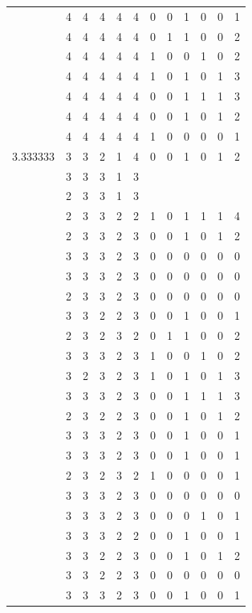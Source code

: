 \documentclass[]{book}
\theoremstyle{definition}
\theoremstyle{definition}
\theoremstyle{definition}
\theoremstyle{remark}
\begin{document}
\begin{table}
{\begin{tabular}[t]{rrrrrrrrrrrr}
 & 4 & 4 & 4 & 4 & 4 & 0 & 0 & 1 & 0 & 0 & 1\\
 & 4 & 4 & 4 & 4 & 4 & 0 & 1 & 1 & 0 & 0 & 2\\
 & 4 & 4 & 4 & 4 & 4 & 1 & 0 & 0 & 1 & 0 & 2\\
 & 4 & 4 & 4 & 4 & 4 & 1 & 0 & 1 & 0 & 1 & 3\\
 & 4 & 4 & 4 & 4 & 4 & 0 & 0 & 1 & 1 & 1 & 3\\
 & 4 & 4 & 4 & 4 & 4 & 0 & 0 & 1 & 0 & 1 & 2\\
 & 4 & 4 & 4 & 4 & 4 & 1 & 0 & 0 & 0 & 0 & 1\\
3.333333 & 3 & 3 & 2 & 1 & 4 & 0 & 0 & 1 & 0 & 1 & 2\\
 & 3 & 3 & 3 & 1 & 3 &  &  &  &  &  & \\
 & 2 & 3 & 3 & 1 & 3 &  &  &  &  &  & \\
 & 2 & 3 & 3 & 2 & 2 & 1 & 0 & 1 & 1 & 1 & 4\\
 & 2 & 3 & 3 & 2 & 3 & 0 & 0 & 1 & 0 & 1 & 2\\
 & 3 & 3 & 3 & 2 & 3 & 0 & 0 & 0 & 0 & 0 & 0\\
 & 3 & 3 & 3 & 2 & 3 & 0 & 0 & 0 & 0 & 0 & 0\\
 & 2 & 3 & 3 & 2 & 3 & 0 & 0 & 0 & 0 & 0 & 0\\
 & 3 & 3 & 2 & 2 & 3 & 0 & 0 & 1 & 0 & 0 & 1\\
 & 2 & 3 & 2 & 3 & 2 & 0 & 1 & 1 & 0 & 0 & 2\\
 & 3 & 3 & 3 & 2 & 3 & 1 & 0 & 0 & 1 & 0 & 2\\
 & 3 & 2 & 3 & 2 & 3 & 1 & 0 & 1 & 0 & 1 & 3\\
 & 3 & 3 & 3 & 2 & 3 & 0 & 0 & 1 & 1 & 1 & 3\\
 & 2 & 3 & 2 & 2 & 3 & 0 & 0 & 1 & 0 & 1 & 2\\
 & 3 & 3 & 3 & 2 & 3 & 0 & 0 & 1 & 0 & 0 & 1\\
 & 3 & 3 & 3 & 2 & 3 & 0 & 0 & 1 & 0 & 0 & 1\\
 & 2 & 3 & 2 & 3 & 2 & 1 & 0 & 0 & 0 & 0 & 1\\
 & 3 & 3 & 3 & 2 & 3 & 0 & 0 & 0 & 0 & 0 & 0\\
 & 3 & 3 & 3 & 2 & 3 & 0 & 0 & 0 & 1 & 0 & 1\\
 & 3 & 3 & 3 & 2 & 2 & 0 & 0 & 1 & 0 & 0 & 1\\
 & 3 & 3 & 2 & 2 & 3 & 0 & 0 & 1 & 0 & 1 & 2\\
 & 3 & 3 & 2 & 2 & 3 & 0 & 0 & 0 & 0 & 0 & 0\\
 & 3 & 3 & 3 & 2 & 3 & 0 & 0 & 1 & 0 & 0 & 1\\

\end{tabular}}
\end{table}
\end{document}
